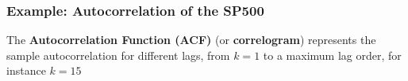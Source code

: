 \documentclass{beamer}
\begin{document}
\begin{frame}
  \frametitle{Example: Autocorrelation of the SP500}
  The \textbf{Autocorrelation Function (ACF)} (or \textbf{correlogram}) represents the sample autocorrelation for different lags, from $k=1$ to a maximum lag order, for instance $k=15$

  
\end{frame}



  
\end{document}
